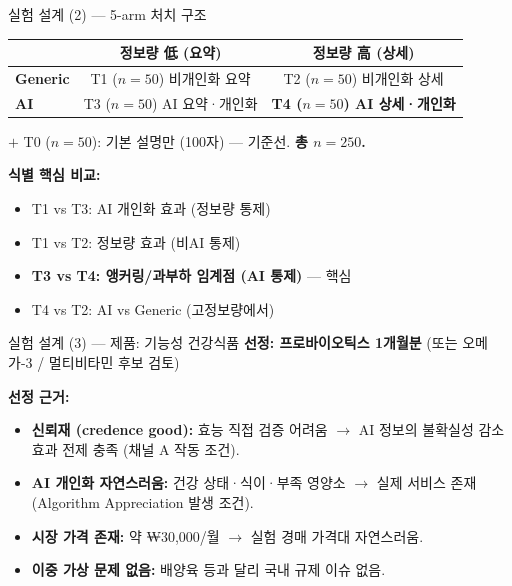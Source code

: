 \documentclass[aspectratio=169]{beamer}
\begin{document}
\begin{frame}{실험 설계 (2) --- 5-arm 처치 구조}
  \begin{center}
  \small
  \begin{tabular}{l|cc}
    & \textbf{정보량 低 (요약)} & \textbf{정보량 高 (상세)} \\
    \hline
    \textbf{Generic} & T1 ($n{=}50$) 비개인화 요약 & T2 ($n{=}50$) 비개인화 상세 \\
    \textbf{AI}      & T3 ($n{=}50$) AI 요약·개인화 & \textbf{T4 ($n{=}50$) AI 상세·개인화} \\
  \end{tabular}
  \end{center}
  \vspace{0.5em}
  $+$ T0 ($n{=}50$): 기본 설명만 (100자) --- 기준선. \textbf{총 $n = 250$.}

  \vspace{0.7em}
  \textbf{식별 핵심 비교:}
  \begin{itemize}\itemsep0.1em
    \item T1 vs T3: AI 개인화 효과 (정보량 통제)
    \item T1 vs T2: 정보량 효과 (비AI 통제)
    \item \textbf{T3 vs T4: 앵커링/과부하 임계점 (AI 통제)} --- 핵심
    \item T4 vs T2: AI vs Generic (고정보량에서)
  \end{itemize}
\end{frame}

\begin{frame}{실험 설계 (3) --- 제품: 기능성 건강식품}
  \textbf{선정: 프로바이오틱스 1개월분} (또는 오메가-3 / 멀티비타민 후보 검토)

  \textbf{선정 근거:}
  \begin{itemize}
    \item \textbf{신뢰재 (credence good):} 효능 직접 검증 어려움 $\rightarrow$ AI 정보의 불확실성 감소 효과 전제 충족 (채널 A 작동 조건).
    \item \textbf{AI 개인화 자연스러움:} 건강 상태·식이·부족 영양소 $\rightarrow$ 실제 서비스 존재 (Algorithm Appreciation 발생 조건).
    \item \textbf{시장 가격 존재:} 약 ₩30,000/월 $\rightarrow$ 실험 경매 가격대 자연스러움.
    \item \textbf{이중 가상 문제 없음:} 배양육 등과 달리 국내 규제 이슈 없음.
  \end{itemize}

  \vspace{0.3em}
\end{frame}
\end{document}
